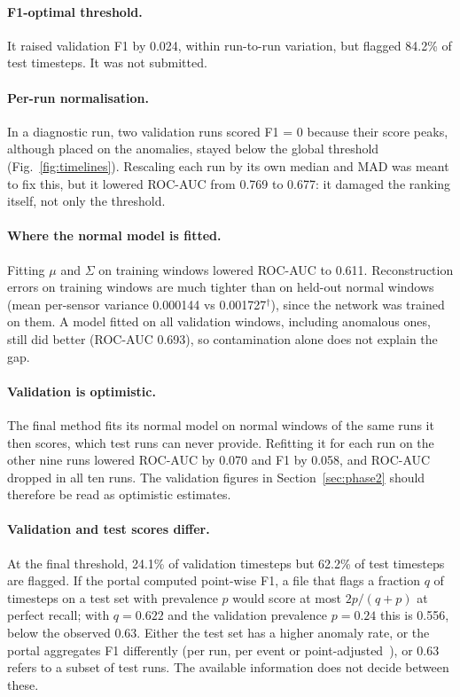 \documentclass[runningheads]{llncs}
\newcommand{\doc}{$^\dagger$}
\begin{document}
\paragraph{F1-optimal threshold.} It raised validation F1 by 0.024, within run-to-run variation, but flagged 84.2\% of test timesteps. It was not submitted.

\paragraph{Per-run normalisation.} In a diagnostic run, two validation runs scored F1 = 0 because their score peaks, although placed on the anomalies, stayed below the global threshold (Fig.~\ref{fig:timelines}). Rescaling each run by its own median and MAD was meant to fix this, but it lowered ROC-AUC from 0.769 to 0.677: it damaged the ranking itself, not only the threshold.

\paragraph{Where the normal model is fitted.} Fitting $\mu$ and $\Sigma$ on training windows lowered ROC-AUC to 0.611. Reconstruction errors on training windows are much tighter than on held-out normal windows (mean per-sensor variance 0.000144 vs 0.001727\doc), since the network was trained on them. A model fitted on all validation windows, including anomalous ones, still did better (ROC-AUC 0.693), so contamination alone does not explain the gap.

\paragraph{Validation is optimistic.} The final method fits its normal model on normal windows of the same runs it then scores, which test runs can never provide. Refitting it for each run on the other nine runs lowered ROC-AUC by 0.070 and F1 by 0.058, and ROC-AUC dropped in all ten runs. The validation figures in Section~\ref{sec:phase2} should therefore be read as optimistic estimates.

\paragraph{Validation and test scores differ.} At the final threshold, 24.1\% of validation timesteps but 62.2\% of test timesteps are flagged. If the portal computed point-wise F1, a file that flags a fraction $q$ of timesteps on a test set with prevalence $p$ would score at most $2p/(q+p)$ at perfect recall; with $q = 0.622$ and the validation prevalence $p = 0.24$ this is 0.556, below the observed 0.63. Either the test set has a higher anomaly rate, or the portal aggregates F1 differently (per run, per event or point-adjusted~\cite{kim2022towards}), or 0.63 refers to a subset of test runs. The available information does not decide between these.
\end{document}
